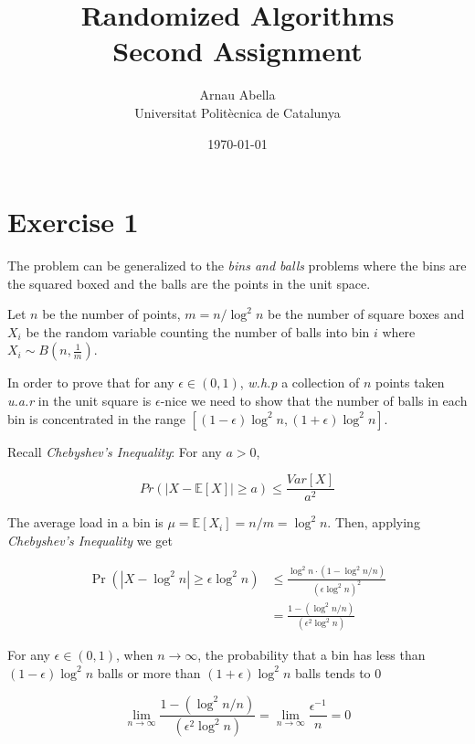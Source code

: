 \documentclass[12pt, a4paper]{article} %
\title{%
  Randomized Algorithms\\
  \large{Second Assignment}
}
\author{%
  Arnau Abella \\
  \large{Universitat Polit\`ecnica de Catalunya}
}
\date{\today}
\newcommand\expect[1]{\mathbb{E}[#1]}
\begin{document}
\maketitle


\section*{Exercise 1}%
\label{sec:exercise_1}

The problem can be generalized to the \textit{bins and balls} problems where the bins are the squared boxed and the balls are the points in the unit space.

Let $n$ be the number of points, $m = n/\log^{2}n$ be the number of square boxes and $X_{i}$ be the random variable counting the number of balls into bin $i$ where $X_{i} \sim B(n, \frac{1}{m})$.

In order to prove that for any $\epsilon \in (0,1)$, \textit{w.h.p} a collection of $n$ points taken \textit{u.a.r} in the unit square is $\epsilon$-nice we need to show that the number of balls in each bin is concentrated in the range $[(1-\epsilon) \log^{2}n, (1 + \epsilon)\log^{2}n]$.

Recall \textit{Chebyshev's Inequality}: For any $a > 0$,

\begin{equation*}
  Pr(|X - \expect{X} | \geq a) \leq \frac{Var[X]}{a^2}
\end{equation*}

The average load in a bin is $\mu = \expect{X_{i}} = n/m = \log^{2} n$. Then, applying \textit{Chebyshev's Inequality} we get

\begin{align*}
  \Pr(|X - \log^{2}n | \geq \epsilon \log^{2}n) &\leq \frac{\log^{2}n \cdot (1 - \log^{2}n/n)}{(\epsilon\log^{2}n)^2} \\
  &= \frac{1 - (\log^{2}n/n)}{(\epsilon^2\log^{2}n)}
\end{align*}

For any $\epsilon \in (0,1)$, when $n \to \infty$, the probability that a bin has less than ${(1-\epsilon) \log^{2}n}$ balls or more than $(1 + \epsilon)\log^{2}n$ balls tends to $0$

\begin{equation*}
  \lim_{n \to \infty} \frac{1 - (\log^{2}n/n)}{(\epsilon^2\log^{2}n)} =
  \lim_{n \to \infty} \frac{\epsilon^{-1}}{n} = 0
\end{equation*}
\end{document}
